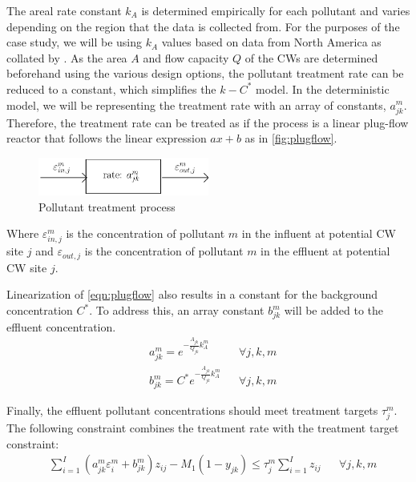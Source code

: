 \documentclass[preprint,12pt,authoryear]{elsarticle}
\begin{document}
The areal rate constant $k_A$ is determined empirically for each pollutant and varies depending on the region that the data is collected from. For the purposes of the case study, we will be using $k_A$ values based on data from North America as collated by \cite{vymazal2008}. As the area $A$ and flow capacity $Q$ of the CWs are determined beforehand using the various design options, the pollutant treatment rate can be reduced to a constant, which simplifies the $k-C^*$ model. In the deterministic model, we will be representing the treatment rate with an array of constants, $a_{jk}^m$. Therefore, the treatment rate can be treated as if the process is a linear plug-flow reactor that follows the linear expression $ax+b$ as in \autoref{fig:plugflow}. 

\begin{figure}[!htpb]
	\centering
	\includegraphics[width=0.5\textwidth]{plugflow.pdf}
	\caption{Pollutant treatment process}
	\label{fig:plugflow}
\end{figure}
Where $\varepsilon_{in,j}^m$ is the concentration of pollutant $m$ in the influent at potential CW site $j$ and $\varepsilon_{out,j}$ is the concentration of pollutant $m$ in the effluent at potential CW site $j$.

Linearization of \autoref{eqn:plugflow} also results in a constant for the background concentration $C^*$. To address this, an array constant $b_{jk}^m$ will be added to the effluent concentration.
\begin{align*}
	&a_{jk}^m = e^{-\frac{A_{jk}}{Q_{jk}}k_A^m} &&\forall j,k,m\\
	&b_{jk}^m = C^* e^{-\frac{A_{jk}}{Q_{jk}}k_A^m} &&\forall j,k,m
\end{align*}

Finally, the effluent pollutant concentrations should meet treatment targets $\tau_j^m$. The following constraint combines the treatment rate with the treatment target constraint:
\begin{align}
	&\sum_{i=1}^{I} (a_{jk}^m \varepsilon_i^m + b_{jk}^m) z_{ij} - M_1(1 - y_{jk}) \leq \tau_j^m \sum_{i=1}^I z_{ij}  && \forall j,k,m
\end{align}
 
\end{document}
